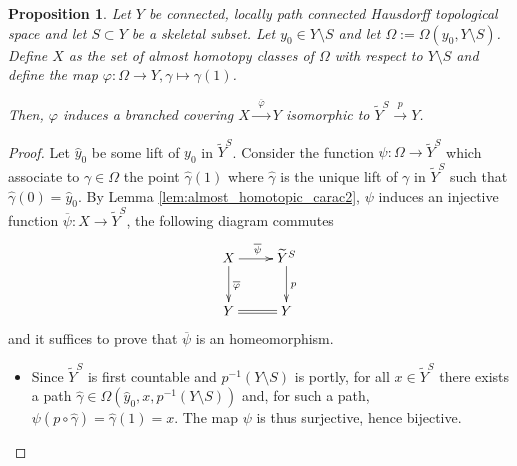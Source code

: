 \documentclass[a4paper,12pt]{article}
\newtheorem{prop}[lem]{Proposition}
\begin{document}
\begin{prop} \label{prop:ramified_covering_path} Let $Y$ be connected, locally path connected Hausdorff topological space and let $S\subset Y$ be a skeletal subset. 
Let $y_0\in Y\setminus S$ and let $\Omega:=\Omega(y_0,Y\setminus S)$. Define $X$ as the set of almost homotopy classes of $\Omega$ with respect to $Y\setminus S$ and define the map $\varphi:\Omega\rightarrow Y, \gamma \mapsto \gamma(1)$.


Then, $\varphi$ induces a branched covering $X \xrightarrow{~~\overline\varphi~~ } Y$  isomorphic to $\widetilde Y^S \xrightarrow{~~p~~} Y$.
 
\end{prop}
\begin{proof}

Let $\hat y_0$ be some lift of $y_0$ in $\widetilde Y^S$.
Consider the function $\psi : \Omega\rightarrow \widetilde Y^S$ which associate to $\gamma\in \Omega$ the point $\hat\gamma(1)$ where $\hat\gamma$ is the unique lift of $\gamma$ in $\widetilde Y^S$ such that $\hat\gamma(0)=\hat y_0$.
By Lemma \ref{lem:almost_homotopic_carac2}, $\psi$ induces an injective function $\overline \psi:X\rightarrow \widetilde Y^S$,
the following diagram commutes
$$\xymatrix{X\ar[d]^{\overline \varphi}\ar[r]^{\overline\psi}& \widetilde Y^S \ar[d]^p \\ Y\ar@{=}[r]&Y}$$
and it suffices to prove that $\overline \psi$ is an homeomorphism.

\begin{itemize}
 \item Since $\widetilde Y^S$ is first countable and $p^{-1}(Y\setminus S)$ is portly, for all $x\in \widetilde Y^S$ there exists a path $\hat\gamma\in \Omega(\hat y_0,x,p^{-1}(Y\setminus S))$ and, for such a path,  $\psi(p\circ \hat\gamma)=\hat\gamma(1)=x$. The map $\psi$ is thus surjective, hence bijective.
 

\end{itemize}
\end{proof}
\end{document}
